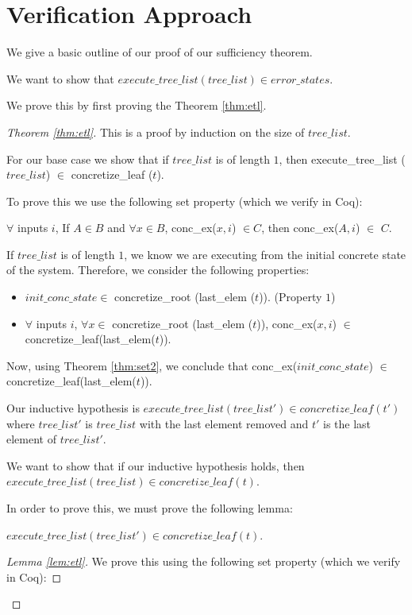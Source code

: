 \section{Verification Approach}
We give a basic outline of our proof of our sufficiency theorem.

We want to show that $execute\_tree\_list (tree\_list) \in error\_states$.

We prove this by first proving the Theorem \ref{thm:etl}.

\begin{proof}[Theorem \ref{thm:etl}]
This is a proof by induction on the size of $tree\_list$.

For our base case we show that if $tree\_list$ is of length $1$, then execute\_tree\_list ($tree\_list$) $\in$ concretize\_leaf ($t$).


To prove this we use the following set property (which we verify in Coq):

\begin{theorem}
\label{thm:set2}
$\forall$ inputs $i$,
If $A \in B$ and 
$\forall x \in B$, conc\_ex($x, i$) $\in C$, then  conc\_ex($A, i$) $\in$ $C$.
\end{theorem}

If $tree\_list$ is of length $1$, we know we are executing from the initial concrete state of the system. Therefore, we consider the following properties:
\begin{itemize}
\item $init\_conc\_state \in$ 
  concretize\_root (last\_elem ($t$)). (Property $1$)
 \item $ \forall$ inputs $i$, 
 $\forall x \in$
  concretize\_root (last\_elem ($t$)),  
  conc\_ex($x, i$) $\in$ concretize\_leaf(last\_elem($t$)).
\end{itemize}

Now, using Theorem \ref{thm:set2}, we conclude that conc\_ex($init\_conc\_state$) $\in$ concretize\_leaf(last\_elem($t$)).

Our inductive hypothesis is  $execute\_tree\_list (tree\_list') \in concretize\_leaf (t')$ where $tree\_list'$ is $tree\_list$ with the last element removed and $t'$ is the last element of $tree\_list'$.

We want to show that if our inductive hypothesis holds, then $execute\_tree\_list (tree\_list) \in concretize\_leaf (t)$.

In order to prove this, we must prove the following lemma:
\begin{lemma} 
\label{lem:etl}
$execute\_tree\_list (tree\_list') \in concretize\_leaf (t)$.
\end{lemma}
\begin{proof}[Lemma \ref{lem:etl}]
We prove this using the following set property (which we verify in Coq):


\end{proof}
\end{proof}
